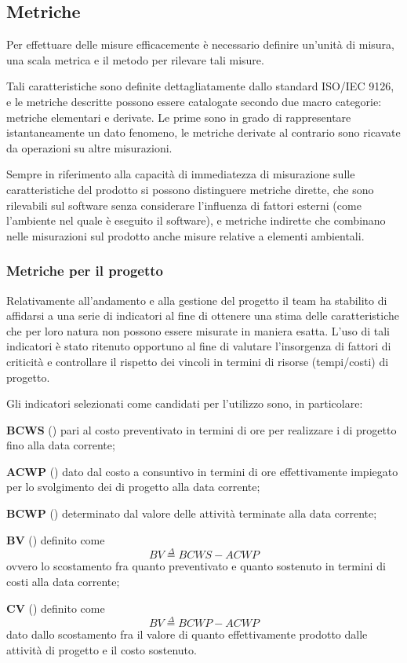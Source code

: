 \subsection{Metriche}
Per effettuare delle misure efficacemente è necessario definire un'unità di misura, una scala metrica e il metodo per rilevare tali misure.

Tali caratteristiche sono definite dettagliatamente dallo standard ISO/IEC 9126, e le metriche descritte possono essere catalogate secondo due macro categorie: metriche elementari e derivate. Le prime sono in grado di rappresentare istantaneamente un dato fenomeno, le metriche derivate al contrario sono ricavate da operazioni su altre misurazioni.

Sempre in riferimento alla capacità di immediatezza di misurazione sulle caratteristiche del prodotto si possono distinguere metriche dirette, che sono rilevabili sul software senza considerare l'influenza di fattori esterni (come l'ambiente nel quale è eseguito il software), e metriche indirette che combinano nelle misurazioni sul prodotto anche misure relative a elementi ambientali.

\subsubsection{Metriche per il progetto}
Relativamente all'andamento e alla gestione del progetto il team ha stabilito di affidarsi a una serie di indicatori al fine di ottenere una stima delle caratteristiche che per loro natura non possono essere misurate in maniera esatta. L'uso di tali indicatori è stato ritenuto opportuno al fine di valutare l'insorgenza di fattori di criticità e controllare il rispetto dei vincoli in termini di risorse (tempi/costi) di progetto.

Gli indicatori selezionati come candidati per l'utilizzo sono, in particolare:
\begin{description}
  \item{\scshape\bfseries BCWS} () pari al costo preventivato in termini di ore per realizzare i  di progetto fino alla data corrente;
  \item{\scshape\bfseries ACWP} () dato dal costo a consuntivo in termini di ore effettivamente impiegato per lo svolgimento dei  di progetto alla data corrente;
  \item{\scshape\bfseries BCWP} () determinato dal valore delle attività terminate alla data corrente;
  \item{\scshape\bfseries BV} () definito come \[BV \stackrel{\Delta}{=} BCWS - ACWP \] ovvero lo scostamento fra quanto preventivato e quanto sostenuto in termini di costi alla data corrente;
  \item{\scshape\bfseries CV} () definito come \[BV \stackrel{\Delta}{=} BCWP - ACWP \] dato dallo scostamento fra il valore di quanto effettivamente prodotto dalle attività di progetto e il costo sostenuto.
\end{description}

